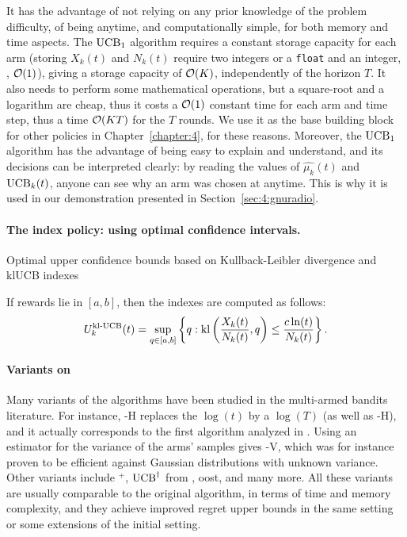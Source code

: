 It has the advantage of not relying on any prior knowledge of the problem difficulty, of being anytime, and computationally simple, for both memory and time aspects.
The $\mathrm{UCB}_1$ algorithm requires a constant storage capacity for each arm (storing $X_k(t)$ and $N_k(t)$ require two integers or a \texttt{float} and an integer, \ie, $\mathop{}\mathopen{}\mathcal{O}\mathopen{}\left(1\right)$), giving a storage capacity of $\mathop{}\mathopen{}\mathcal{O}\mathopen{}\left(K\right)$, independently of the horizon $T$.
It also needs to perform some mathematical operations, but a square-root and a logarithm are cheap, thus it costs a $\mathop{}\mathopen{}\mathcal{O}\mathopen{}\left(1\right)$ constant time for each arm and time step, thus a time $\mathop{}\mathopen{}\mathcal{O}\mathopen{}\left(K T\right)$ for the $T$ rounds.
%
We use it as the base building block for other policies in Chapter~\ref{chapter:4}, for these reasons.
Moreover, the $\mathrm{UCB}_1$ algorithm has the advantage of being easy to explain and understand, and its decisions can be interpreted clearly: by reading the values of $\widehat{\mu_k}(t)$ and $\mathrm{UCB}_k(t)$, anyone can see why an arm was chosen at anytime.
This is why it is used in our demonstration presented in Section~\ref{sec:4:gnuradio}.


\paragraph{The \klUCB{} index policy: using optimal confidence intervals.}


Optimal upper confidence bounds based on Kullback-Leibler divergence and klUCB indexes

If rewards lie in $[a,b]$, then the indexes are computed as follows:
\begin{align}\label{eq:klUCB_index}
    U_k^{\mathrm{kl}\text{-}\mathrm{UCB}}(t) = \sup\limits_{q \in [a, b]} \left\{ q : \mathrm{kl}\left(\frac{X_k(t)}{N_k(t)}, q\right) \leq \frac{c \ln(t)}{N_k(t)} \right\}.
\end{align}



\paragraph{Variants on \UCB}

Many variants of the \UCB{} algorithms have been studied in the multi-armed bandits literature.
For instance, \UCB-H replaces the $\log(t)$ by a $\log(T)$ (as well as \klUCB-H), and it actually corresponds to the first algorithm analyzed in \cite{Auer02}.
Using an estimator for the variance of the arms' samples gives \UCB-V, which was for instance proven to be efficient against Gaussian distributions with unknown variance.
Other variants include \UCB$^+$, $\mathrm{UCB}^{\dagger}$ from \cite{Lattimore2018refining}, {\UCB}oost, and many more.
%
All these variants are usually comparable to the original \UCB{} algorithm, in terms of time and memory complexity, and they achieve improved regret upper bounds in the same setting or some extensions of the initial setting.


